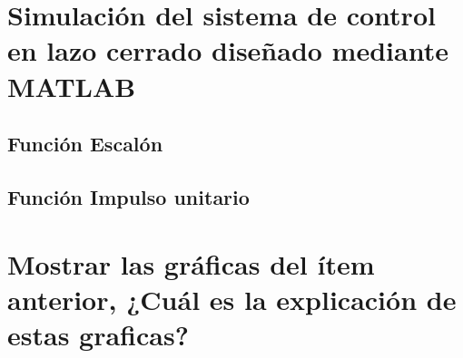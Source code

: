 \documentclass[conference]{IEEEtran}
\begin{document}
	\section{Simulación del sistema de control en lazo cerrado diseñado mediante MATLAB}	
	
	\subsection{Función Escalón}
	\subsection{Función Impulso unitario}
	
	\section{Mostrar las gráficas del ítem anterior, ¿Cuál es la explicación de estas graficas?}
	
	
	
	
\end{document}
